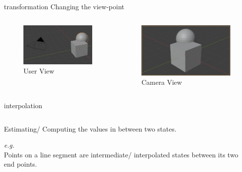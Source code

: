 \documentclass[aspectratio=169,xcolor={dvipsnames,svgnames}]{beamer}
\begin{document}
\begin{frame}[label={sec:org416c8ea}]{transformation}
Changing the view-point

\begin{columns}
\begin{column}{.5\columnwidth}
\begin{figure}[htbp]
\centering
\includegraphics[width=.9\linewidth]{images/user-view.jpg}
\caption{User View}
\end{figure}
\end{column}

\begin{column}{.5\columnwidth}
\begin{figure}[htbp]
\centering
\includegraphics[width=.9\linewidth]{images/camera-view.jpg}
\caption{Camera View}
\end{figure}
\end{column}
\end{columns}
\end{frame}
\begin{frame}[label={sec:orgdb3c27b}]{interpolation}
\begin{columns}
\begin{column}{.45\columnwidth}
Estimating/ Computing the values in between two states.

\emph{e.g.} \\[0pt]
Points on a line segment are intermediate/ interpolated
states between its two end points.
\end{column}
\end{columns}
\end{frame}
\end{document}
